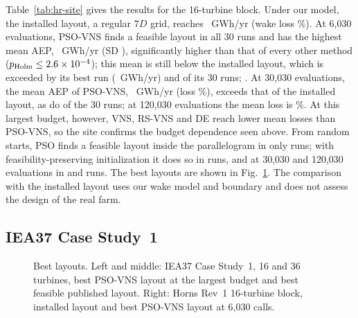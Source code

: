 Table~\ref{tab:hr-site} gives the results for the 16-turbine block. Under our model, the installed layout, a regular $7D$ grid, reaches \NHRInstalled~GWh/yr (wake loss \NHRInstalledLoss\%). At 6,030 evaluations, PSO-VNS finds a feasible layout in all 30 runs and has the highest mean AEP, \NHRMeanPSOVNS~GWh/yr (SD \NHRSDPSOVNS), significantly higher than that of every other method ($p_{\rm Holm}\le2.6\times10^{-4}$); this mean is still below the installed layout, which is exceeded by its best run (\NHRBestPSOVNS~GWh/yr) and \NHRAbovePSOVNS{} of its 30 runs; \NHRAboveOthersPhrase. At 30,030 evaluations, the mean AEP of PSO-VNS, \NHRMeanThirtyKPSOVNS~GWh/yr (loss \NHRLossThirtyKPSOVNS\%), exceeds that of the installed layout, as do \NHRAboveThirtyKPSOVNS{} of the 30 runs; at 120,030 evaluations the mean loss is \NHRLossOneTwentyKPSOVNS\%. At this largest budget, however, VNS, RS-VNS and DE reach lower mean losses than PSO-VNS, so the site confirms the budget dependence seen above. From random starts, PSO finds a feasible layout inside the parallelogram in only \NHRFeasPSO{} runs; with feasibility-preserving initialization it does so in \NHRFeasFeasInitPSO{} runs, and at 30,030 and 120,030 evaluations in \NHRFeasThirtyKPSO{} and \NHRFeasOneTwentyKPSO{} runs. The best layouts are shown in Fig.~\ref{fig:layouts}. The comparison with the installed layout uses our wake model and boundary and does not assess the design of the real farm.

\subsection{IEA37 Case Study~1}
\label{sec:iea37}

\begin{figure}[!t]
\centering
{}
\caption{Best layouts. Left and middle: IEA37 Case Study~1, 16 and 36 turbines, best PSO-VNS layout at the largest budget and best feasible published layout. Right: Horns Rev~1 16-turbine block, installed layout and best PSO-VNS layout at 6,030 calls.}
\label{fig:layouts}
\end{figure}

